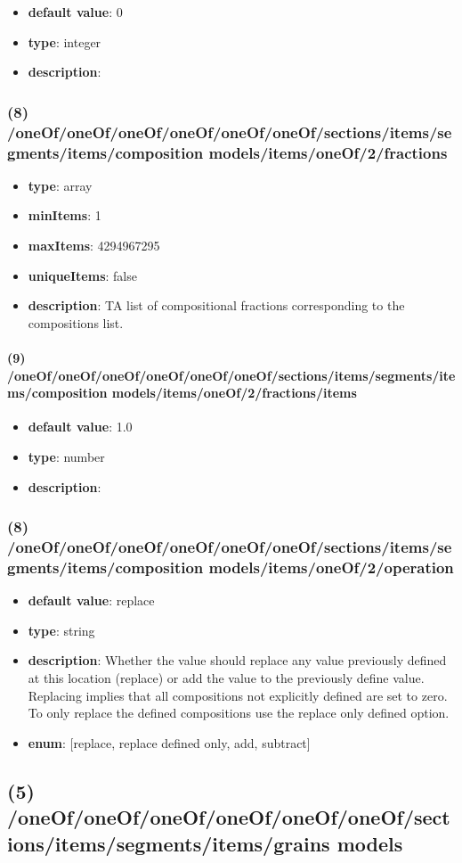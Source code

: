 \begin{itemize}[leftmargin=9em]\item {\bf default value}: 0
\item {\bf type}: integer
\item {\bf description}: 
\end{itemize}\subsubsection{(8) /oneOf/oneOf/oneOf/oneOf/oneOf/oneOf/sections/items/segments/items/composition models/items/oneOf/2/fractions}
\begin{itemize}[leftmargin=8em]\item {\bf type}: array
\item {\bf minItems}: 1
\item {\bf maxItems}: 4294967295
\item {\bf uniqueItems}: false
\item {\bf description}: TA list of compositional fractions corresponding to the compositions list.
\end{itemize}\paragraph{(9) /oneOf/oneOf/oneOf/oneOf/oneOf/oneOf/sections/items/segments/items/composition models/items/oneOf/2/fractions/items}
\begin{itemize}[leftmargin=9em]\item {\bf default value}: 1.0
\item {\bf type}: number
\item {\bf description}: 
\end{itemize}\subsubsection{(8) /oneOf/oneOf/oneOf/oneOf/oneOf/oneOf/sections/items/segments/items/composition models/items/oneOf/2/operation}
\begin{itemize}[leftmargin=8em]\item {\bf default value}: replace
\item {\bf type}: string
\item {\bf description}: Whether the value should replace any value previously defined at this location (replace) or add the value to the previously define value. Replacing implies that all compositions not explicitly defined are set to zero. To only replace the defined compositions use the replace only defined option.
\item {\bf enum}: [replace, replace defined only, add, subtract]\end{itemize}\subsection{(5) /oneOf/oneOf/oneOf/oneOf/oneOf/oneOf/sections/items/segments/items/grains models}
